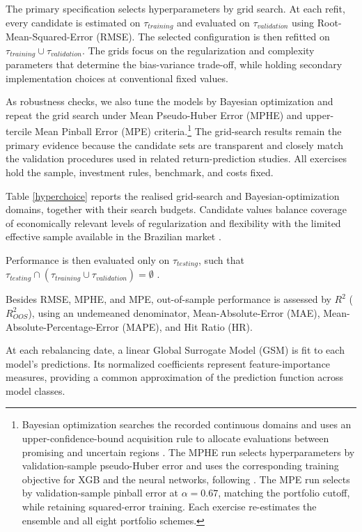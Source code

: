 \documentclass[preprint,12pt,authoryear]{elsarticle}
\begin{document}
The primary specification selects hyperparameters by grid search. At each refit, every candidate is estimated on $\tau_{training}$ and evaluated on $\tau_{validation}$ using Root-Mean-Squared-Error (RMSE). The selected configuration is then refitted on $\tau_{training} \cup \tau_{validation}$. The grids focus on the regularization and complexity parameters that determine the bias-variance trade-off, while holding secondary implementation choices at conventional fixed values.

As robustness checks, we also tune the models by Bayesian optimization and repeat the grid search under Mean Pseudo-Huber Error (MPHE) and upper-tercile Mean Pinball Error (MPE) criteria.\footnote{Bayesian optimization searches the recorded continuous domains and uses an upper-confidence-bound acquisition rule to allocate evaluations between promising and uncertain regions \citep{bouthilliervaroquaux2020}. The MPHE run selects hyperparameters by validation-sample pseudo-Huber error and uses the corresponding training objective for XGB and the neural networks, following \citet{gukellyxiu2020}. The MPE run selects by validation-sample pinball error at $\alpha=0.67$, matching the portfolio cutoff, while retaining squared-error training. Each exercise re-estimates the ensemble and all eight portfolio schemes.} The grid-search results remain the primary evidence because the candidate sets are transparent and closely match the validation procedures used in related return-prediction studies. All exercises hold the sample, investment rules, benchmark, and costs fixed.

Table \ref{hyperchoice} reports the realised grid-search and Bayesian-optimization domains, together with their search budgets. Candidate values balance coverage of economically relevant levels of regularization and flexibility with the limited effective sample available in the Brazilian market \citep{lavalle2004relationship}.

Performance is then evaluated only on $\tau_{testing}$, such that $\tau_{testing} \cap (\tau_{training} \cup \tau_{validation}) = \emptyset$ \citep{gukellyxiu2020, kellyxiu2023}.

Besides RMSE, MPHE, and MPE, out-of-sample performance is assessed by $R^{2}$ ($R_{OOS}^{2}$), using an undemeaned denominator, Mean-Absolute-Error (MAE), Mean-Absolute-Percentage-Error (MAPE), and Hit Ratio (HR). 

At each rebalancing date, a linear Global Surrogate Model (GSM) is fit to each model's predictions. Its normalized coefficients represent feature-importance measures, providing a common approximation of the prediction function across model classes.
\end{document}
